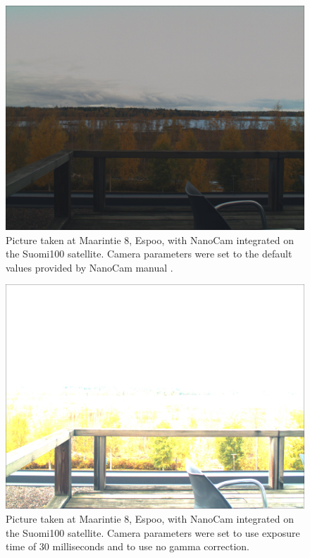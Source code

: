 \documentclass[english,12pt,a4paper,pdftex,elec,utf8]{aaltothesis}
\begin{document}
\begin{figure}[h!]
\centering
\includegraphics[scale=0.2]{def}
\caption{Picture taken at Maarintie 8, Espoo, with NanoCam integrated on the Suomi100 satellite. Camera parameters were set to the default values provided by NanoCam manual \cite{nanocamds}.}
\label{camerapic1}
\end{figure}
\begin{figure}[h!]
\centering
\includegraphics[scale=0.2]{def23}
\caption{Picture taken at Maarintie 8, Espoo, with NanoCam integrated on the Suomi100 satellite. Camera parameters were set to use exposure time of 30 milliseconds and to use no gamma correction.}
\label{camerapic2}
\end{figure}
\end{document}

